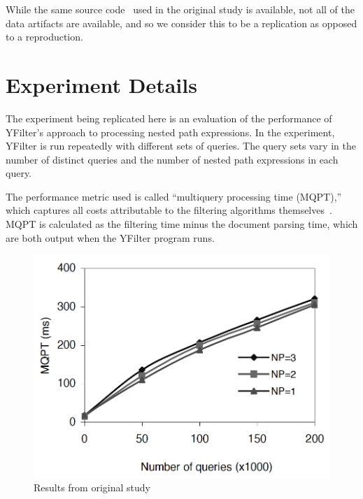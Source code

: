 \documentclass[sigconf, nonacm]{acmart}
\begin{document}

While the same source code~\cite{yfilter_source} used in the original study is available, not all of the data artifacts are available, and so we consider this to be a replication as opposed to a reproduction. 

\section{Experiment Details}

The experiment being replicated here is an evaluation of the performance of YFilter's approach to processing nested path expressions. In the experiment, YFilter is run repeatedly with different sets of queries. The query sets vary in the number of distinct queries and the number of nested path expressions in each query.

The performance metric used is called ``multiquery processing time (MQPT),'' which captures all costs attributable to the filtering algorithms themselves~\cite{yfilter}. MQPT is calculated as the filtering time minus the document parsing time, which are both output when the YFilter program runs.


\begin{figure}
  \centering
  \includegraphics[width=0.75\linewidth]{results/reference_figure.png}
  \caption{Results from original study~\cite{yfilter}}
  \label{fig:reference_figure}
\end{figure}
\end{document}
